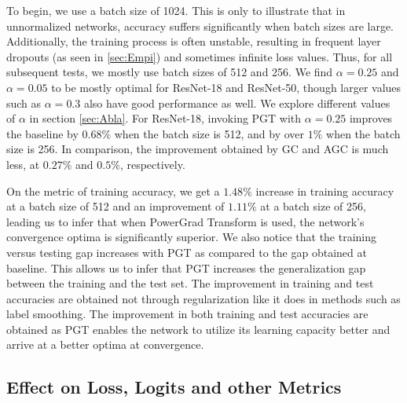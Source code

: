\documentclass[times,sort&compress]{elsarticle}
\begin{document}
To begin, we use a batch size of 1024. This is only to illustrate that in unnormalized
networks, accuracy suffers significantly when batch sizes are large. Additionally, the
training process is often unstable, resulting in frequent layer dropouts (as seen in
\ref{sec:Empi}) and sometimes infinite loss values. Thus, for all subsequent tests, we
mostly use batch sizes of 512 and 256. We find $\alpha=0.25$ and $\alpha=0.05$ to be
mostly optimal for ResNet-18 and ResNet-50, though larger values such as $\alpha=0.3$
also have good performance as well. We explore different values of $\alpha$ in section
\ref{sec:Abla}. For ResNet-18, invoking PGT with $\alpha=0.25$ improves the baseline by
$0.68\%$ when the batch size is 512, and by over $1\%$ when the batch size is 256. In
comparison, the improvement obtained by GC and AGC is much less, at $0.27\%$ and
$0.5\%$, respectively.

On the metric of training accuracy, we get a $1.48\%$ increase in training accuracy at a
batch size of 512 and an improvement of $1.11\%$ at a batch size of 256, leading us to
infer that when PowerGrad Transform is used, the network's convergence optima is
significantly superior. We also notice that the training versus testing gap increases
with PGT as compared to the gap obtained at baseline. This allows us to infer that PGT
increases the generalization gap between the training and the test set. The improvement
in training and test accuracies are obtained not through regularization like it does in
methods such as label smoothing. The improvement in both training and test accuracies
are obtained as PGT enables the network to utilize its learning capacity better and
arrive at a better optima at convergence.






\subsection{Effect on Loss, Logits and other Metrics}
\label{sec:Effe}
\end{document}
